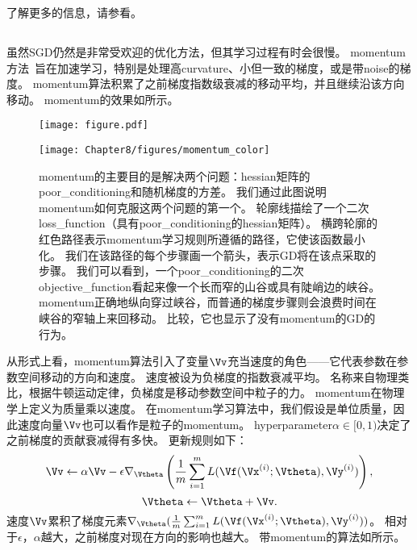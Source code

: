 了解更多的信息，请参看\cite{Bottou98}。

\subsection{}
\label{sec:momentum}
虽然\gls{SGD}仍然是非常受欢迎的优化方法，但其学习过程有时会很慢。
\gls{momentum}方法~\citep{polyak1964some}旨在加速学习，特别是处理高\gls{curvature}、小但一致的梯度，或是带\gls{noise}的梯度。
\gls{momentum}算法积累了之前梯度指数级衰减的移动平均，并且继续沿该方向移动。
\gls{momentum}的效果如所示。


\begin{figure}[!htb]
\ifOpenSource
\centerline{\texttt{[image: figure.pdf]}}
\else
\centerline{\texttt{[image: Chapter8/figures/momentum\_color]}}
\fi
\caption{\gls{momentum}的主要目的是解决两个问题：\gls{hessian}矩阵的\gls{poor_conditioning}和随机梯度的方差。 
我们通过此图说明\gls{momentum}如何克服这两个问题的第一个。
轮廓线描绘了一个二次\gls{loss_function}（具有\gls{poor_conditioning}的\gls{hessian}矩阵）。
横跨轮廓的红色路径表示\gls{momentum}学习规则所遵循的路径，它使该函数最小化。
我们在该路径的每个步骤画一个箭头，表示\gls{GD}将在该点采取的步骤。
我们可以看到，一个\gls{poor_conditioning}的二次\gls{objective_function}看起来像一个长而窄的山谷或具有陡峭边的峡谷。
\gls{momentum}正确地纵向穿过峡谷，而普通的梯度步骤则会浪费时间在峡谷的窄轴上来回移动。
比较，它也显示了没有\gls{momentum}的\gls{GD}的行为。
}
\label{fig:chap8_momentum}
\end{figure}


从形式上看，\gls{momentum}算法引入了变量$\Vv$充当速度的角色——它代表参数在参数空间移动的方向和速度。
速度被设为负梯度的指数衰减平均。
名称来自物理类比，根据牛顿运动定律，负梯度是移动参数空间中粒子的力。
\gls{momentum}在物理学上定义为质量乘以速度。
在\gls{momentum}学习算法中，我们假设是单位质量，因此速度向量$\Vv$也可以看作是粒子的\gls{momentum}。
\gls{hyperparameter}$\alpha\in[0,1)$决定了之前梯度的贡献衰减得有多快。
更新规则如下：
\begin{equation}
\Vv \leftarrow \alpha \Vv - \epsilon \nabla_{\Vtheta} \left( \frac{1}{m} \sum_{i=1}^m  L(\Vf(\Vx^{(i)}; \Vtheta), \Vy^{(i)}   )  \right),
\end{equation}
\begin{equation}
\Vtheta \leftarrow \Vtheta  + \Vv .
\end{equation}
速度$\Vv$累积了梯度元素$\nabla_{\Vtheta}( \frac{1}{m} \sum_{i=1}^m L( \Vf(\Vx^{(i)}; \Vtheta), \Vy^{(i)} )  )$。
相对于$\epsilon$，$\alpha$越大，之前梯度对现在方向的影响也越大。
带\gls{momentum}的算法如所示。


